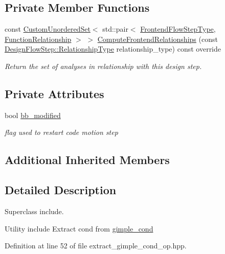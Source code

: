 \subsection*{Private Member Functions}
\begin{DoxyCompactItemize}
\item 
const \hyperlink{classCustomUnorderedSet}{Custom\+Unordered\+Set}$<$ std\+::pair$<$ \hyperlink{frontend__flow__step_8hpp_afeb3716c693d2b2e4ed3e6d04c3b63bb}{Frontend\+Flow\+Step\+Type}, \hyperlink{classFrontendFlowStep_af7cf30f2023e5b99e637dc2058289ab0}{Function\+Relationship} $>$ $>$ \hyperlink{classExtractGimpleCondOp_a58a0db8419d00874681aa7611a502d6a}{Compute\+Frontend\+Relationships} (const \hyperlink{classDesignFlowStep_a723a3baf19ff2ceb77bc13e099d0b1b7}{Design\+Flow\+Step\+::\+Relationship\+Type} relationship\+\_\+type) const override
\begin{DoxyCompactList}\small\item\em Return the set of analyses in relationship with this design step. \end{DoxyCompactList}\end{DoxyCompactItemize}
\subsection*{Private Attributes}
\begin{DoxyCompactItemize}
\item 
bool \hyperlink{classExtractGimpleCondOp_a446308f9f1e1e19c29156d2f28c19366}{bb\+\_\+modified}
\begin{DoxyCompactList}\small\item\em flag used to restart code motion step \end{DoxyCompactList}\end{DoxyCompactItemize}
\subsection*{Additional Inherited Members}


\subsection{Detailed Description}
Superclass include. 

Utility include Extract cond from \hyperlink{structgimple__cond}{gimple\+\_\+cond} 

Definition at line 52 of file extract\+\_\+gimple\+\_\+cond\+\_\+op.\+hpp.



